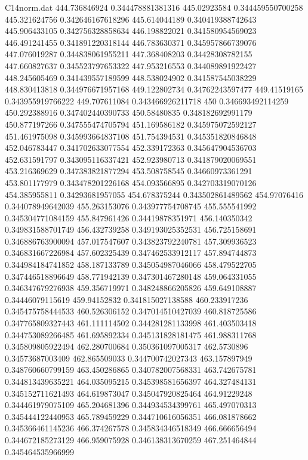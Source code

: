 \begin{filecontents}{C14norm.dat}
444.736846924			0.344478881381316
445.02923584			0.344459550700258
445.321624756			0.342646167618296
445.614044189			0.340419388742643
445.906433105			0.342756328858634
446.198822021			0.341580954569023
446.491241455			0.341891220318144
446.783630371			0.345957866739076
447.076019287			0.344838061955211
447.368408203			0.34428308782155
447.660827637			0.345523797653322
447.953216553			0.344089891922427
448.245605469			0.341439557189599
448.538024902			0.341587545038229
448.830413818			0.344976671957168
449.122802734			0.34762243597477
449.41519165			0.343955919766222
449.707611084			0.343466926211718
450			0.346693492114259
450.292388916			0.347402440390733
450.58480835			0.348182692991179
450.877197266			0.347555474705794
451.169586182			0.345975072592127
451.461975098			0.345993664837108
451.754394531			0.345351820846848
452.046783447			0.341702633077554
452.339172363			0.345647904536703
452.631591797			0.343095116337421
452.923980713			0.341879020069551
453.216369629			0.347383821877294
453.508758545			0.34660973361291
453.801177979			0.343478201226168
454.093566895			0.342703319070126
454.385955811			0.34293681957055
454.678375244			0.343502861489562
454.97076416			0.344078949642039
455.263153076			0.343977754708745
455.555541992			0.345304771084159
455.847961426			0.34419878351971
456.140350342			0.349831588701749
456.432739258			0.349193025352531
456.725158691			0.346886763900094
457.017547607			0.343823792240781
457.309936523			0.346831667226984
457.602325439			0.347462533912117
457.894744873			0.344984184741852
458.187133789			0.345054987046066
458.479522705			0.347446518896649
458.771942139			0.347301467280148
459.064331055			0.346347679276938
459.356719971			0.348248866205826
459.649108887			0.34446079115619
459.94152832			0.341815027138588
460.233917236			0.345475758444533
460.526306152			0.347014510427039
460.818725586			0.347765809327443
461.111114502			0.344281281133998
461.403503418			0.344753089266485
461.695892334			0.345131828181475
461.988311768			0.345809805922494
462.280700684			0.350361097005317
462.5730896			0.34573687003409
462.865509033			0.344700742027343
463.157897949			0.348760660799159
463.450286865			0.340782007568331
463.742675781			0.344813439635221
464.035095215			0.345398581656397
464.327484131			0.345152711621493
464.619873047			0.345047920825464
464.91229248			0.344461979075109
465.204681396			0.344934534399761
465.497070313			0.345444122440953
465.789459229			0.344710616056351
466.081878662			0.345366461145236
466.374267578			0.345834346518349
466.666656494			0.344672185273129
466.959075928			0.346138313670259
467.251464844			0.345464535966999

\end{filecontents}
